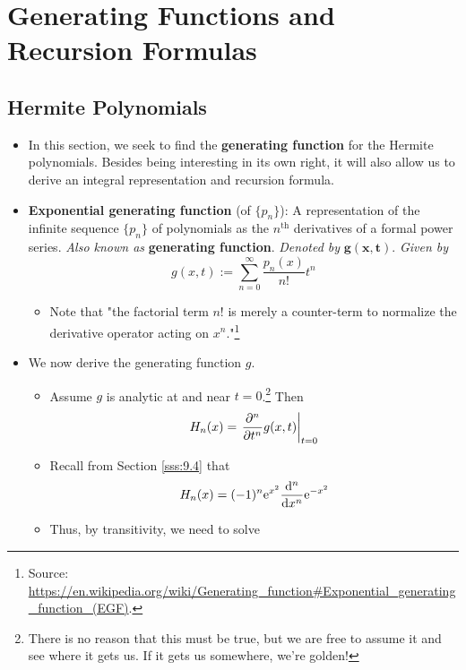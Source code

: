 \documentclass[../finalProject.tex]{subfiles}
\begin{document}
\section{Generating Functions and Recursion Formulas}
\subsection{Hermite Polynomials}
\begin{itemize}
    \item {}In this section, we seek to find the \textbf{generating function} for the Hermite polynomials. Besides being interesting in its own right, it will also allow us to derive an integral representation and recursion formula.
    \item \textbf{Exponential generating function} (of $\{p_n\}$): A representation of the infinite sequence $\{p_n\}$ of polynomials as the $n^\text{th}$ derivatives of a formal power series. \emph{Also known as} \textbf{generating function}. \emph{Denoted by} $\bm{g(x,t)}$. \emph{Given by}
    \begin{equation*}
        g(x,t) := \sum_{n=0}^\infty\frac{p_n(x)}{n!}t^n
    \end{equation*}
    \begin{itemize}
        \item Note that "the factorial term $n!$ is merely a counter-term to normalize the derivative operator acting on $x^n$."\footnote{Source: \url{https://en.wikipedia.org/wiki/Generating_function\#Exponential_generating_function_(EGF)}.}
    \end{itemize}
    \item We now derive the generating function $g$.
    \begin{itemize}
        \item Assume $g$ is analytic at and near $t=0$.\footnote{There is no reason that this must be true, but we are free to assume it and see where it gets us. If it gets us somewhere, we're golden!} Then
        \begin{equation*}
            H_n(x) = \eval{\pdv[n]{t}g(x,t)}_{t=0}
        \end{equation*}
        \item Recall from Section \ref{sss:9.4} that
        \begin{equation*}
            H_n(x) = (-1)^n\e[x^2]\dv[n]{x}\e[-x^2]
        \end{equation*}
        \item Thus, by transitivity, we need to solve

\end{itemize}
\end{itemize}
\end{document}
